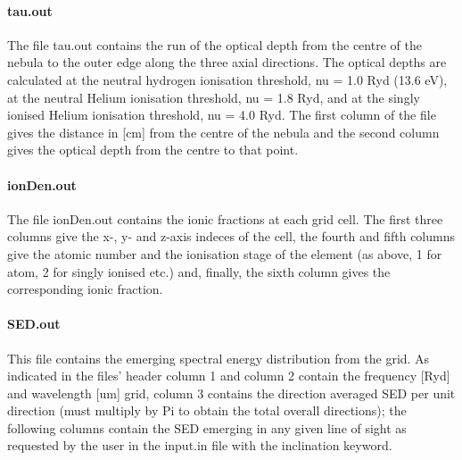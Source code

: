 \documentclass[11pt]{article}
\begin{document}
    
\paragraph{    tau.out}
    The file tau.out contains the run of the optical depth from the centre of the 
    nebula to the outer edge along the three axial directions. The optical depths 
    are calculated at the neutral hydrogen ionisation threshold, nu = 1.0 Ryd 
    (13.6 eV), at the neutral Helium ionisation threshold, nu = 1.8 Ryd, and at 
    the singly ionised Helium ionisation threshold, nu = 4.0 Ryd. The first column 
    of the file gives the distance in [cm] from the centre of the nebula and the 
    second column gives the optical depth from the centre to that point. \\

\paragraph{    ionDen.out}
    The file ionDen.out contains the ionic fractions at each grid cell. The first 
    three columns give the x-, y- and z-axis indeces of the cell, the fourth and 
    fifth columns give the atomic number and the ionisation stage of the element 
    (as above, 1 for atom, 2 for singly ionised etc.) and, finally, the sixth 
    column gives the corresponding ionic fraction.\\

\paragraph{    SED.out}
    This file contains the emerging spectral energy distribution from the grid. 
    As indicated in the files' header column 1 and column 2 contain the frequency 
    [Ryd] and wavelength [um] grid, column 3 contains the direction averaged 
    SED per unit direction (must multiply by Pi to obtain the total overall 
    directions); the following columns contain the SED emerging in any given 
    line of sight as requested by the user in the input.in file with the 
    inclination keyword.\\
\end{document}
